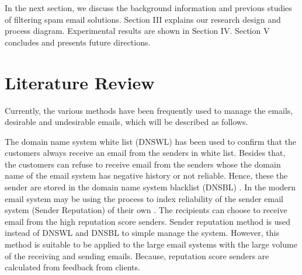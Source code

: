 \documentclass[conference]{IEEEtran}
\begin{document}
In the next section, we discuss the background information and previous studies of filtering spam email solutions. 
%
Section III explains our research design and process diagram. 
%
Experimental results are shown in Section IV.
%
Section V concludes and presents future directions.
%
\section{Literature Review}
Currently, the various methods \cite{levine, Sochor, Lazzari, DBLP:taylor, wong, NguyenTuanAnh, Seike, crocker, Leiba, Higashikado, upasana, XiaoJunyong, falk, FalkKucherawy, gmail} have been frequently used to manage the emails, desirable and undesirable emails, which will be described as follows.

The domain name system white list (DNSWL) \cite{levine} has been used to confirm that the customers always receive an email from the senders in white list.
%
Besides that, the customers can refuse to receive email from the senders whose the domain name of the email system has negative history or not reliable. 
%
Hence, these the sender are stored in the domain name system blacklist (DNSBL) \cite{levine,Sochor,Lazzari}.
%
In the modern email system may be using the process to index reliability of the sender email system (Sender Reputation) of their own \cite{DBLP:taylor}. 
%
The recipients can choose to receive email
from the high reputation score senders.
Sender reputation method is used instead of DNSWL and DNSBL to simple manage the system.
However, this method is suitable to be applied to the large email systems with the large volume of the receiving and sending emails.
Because, reputation score senders are calculated from feedback from clients.
\end{document}
